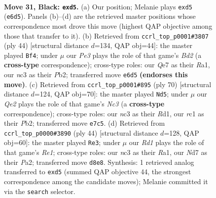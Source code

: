 \documentclass[11pt]{article}
\begin{document}
\clearpage

\begin{figure}[p]\centering
\begin{subfigure}{0.46\textwidth}\centering
\resizebox{\linewidth}{!}{%
\newchessgame
\chessboard[
  setfen={3r2k1/3nq1p1/rp2pn2/3Pp2p/P7/2N2NP1/2P2P1P/R1R1Q1K1 b - - 0 31},
  showmover=false,
  pgfstyle=straightmove, color=movearrow, markmove={e6-d5}
]}
\caption{}
\end{subfigure}\hfill
\begin{subfigure}{0.46\textwidth}\centering
\resizebox{\linewidth}{!}{%
\newchessgame
\chessboard[
  setfen={r3k2r/pp2qpb1/2pn4/8/3Pn2p/P1NQ3P/1P1BN1P1/R4RK1 w kq - 5 23},
  showmover=false,
  pgfstyle=straightmove, color=movearrow, markmove={d2-f4}
]}
\caption{}
\end{subfigure}
\\[4pt]
\begin{subfigure}{0.46\textwidth}\centering
\resizebox{\linewidth}{!}{%
\newchessgame
\chessboard[
  setfen={4r1k1/1q3p2/1pnprn2/2p4p/P3P3/1NN2QPP/1P2R1K1/3R4 w - - 1 36},
  showmover=false,
  pgfstyle=straightmove, color=movearrow, markmove={c3-d5}
]}
\caption{}
\end{subfigure}\hfill
\begin{subfigure}{0.46\textwidth}\centering
\resizebox{\linewidth}{!}{%
\newchessgame
\chessboard[
  setfen={r4rk1/1p1n4/p3pq1p/3p2p1/3P1n2/1PN2N1P/P2Q1PP1/R3R1K1 w - - 0 23},
  showmover=false,
  pgfstyle=straightmove, color=movearrow, markmove={e1-e3}
]}
\caption{}
\end{subfigure}
\caption{\textbf{Move 31, Black: \texttt{exd5}.} (a) Our position; Melanie plays \texttt{exd5} (\texttt{e6d5}). Panels (b)--(d) are the retrieved master positions whose correspondence most drove this move (highest QAP objective among those that transfer to it). (b) Retrieved from \texttt{ccrl\_top\_p0001\#3807} (ply 44) [structural distance $d$=134, QAP obj=44]: the master played \texttt{Bf4}; under $\mu$ our \emph{Pe3} plays the role of that game's \emph{Bd2} (a \textbf{cross-type} correspondence); cross-type roles: our \emph{Q}e7 as their \emph{R}a1, our \emph{n}c3 as their \emph{P}b2; transferred move \texttt{e6d5} \textbf{(endorses this move)}. (c) Retrieved from \texttt{ccrl\_top\_p0001\#895} (ply 70) [structural distance $d$=124, QAP obj=70]: the master played \texttt{Nd5}; under $\mu$ our \emph{Qe2} plays the role of that game's \emph{Nc3} (a \textbf{cross-type} correspondence); cross-type roles: our \emph{n}c3 as their \emph{R}d1, our \emph{r}c1 as their \emph{P}b2; transferred move \texttt{e7c5}. (d) Retrieved from \texttt{ccrl\_top\_p0000\#3890} (ply 44) [structural distance $d$=128, QAP obj=60]: the master played \texttt{Re3}; under $\mu$ our \emph{Rd1} plays the role of that game's \emph{Re1}; cross-type roles: our \emph{n}c3 as their \emph{R}a1, our \emph{N}d7 as their \emph{P}a2; transferred move \texttt{d8e8}. Synthesis: 1 retrieved analog transferred to \texttt{exd5} (summed QAP objective 44, the strongest correspondence among the candidate moves); Melanie committed it via the \texttt{search} selector.}
\label{fig:thought-m61}
\end{figure}
\end{document}
